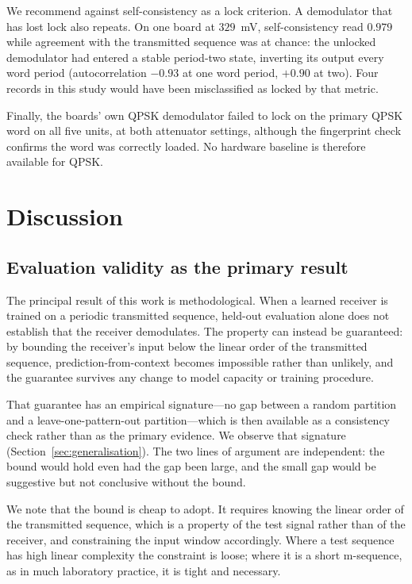 \documentclass[journal]{IEEEtran}   %
\begin{document}
We recommend against self-consistency as a lock criterion. A demodulator that
has lost lock also repeats. On one board at $329$~mV, self-consistency read
$0.979$ while agreement with the transmitted sequence was at chance: the
unlocked demodulator had entered a stable period-two state, inverting its output
every word period (autocorrelation $-0.93$ at one word period, $+0.90$ at two).
Four records in this study would have been misclassified as locked by that
metric.

Finally, the boards' own QPSK demodulator failed to lock on the primary QPSK
word on all five units, at both attenuator settings, although the fingerprint
check confirms the word was correctly loaded. No hardware baseline is therefore
available for QPSK.

\section{Discussion}

\subsection{Evaluation validity as the primary result}
The principal result of this work is methodological. When a learned receiver is
trained on a periodic transmitted sequence, held-out evaluation alone does not
establish that the receiver demodulates. The property can instead be guaranteed:
by bounding the receiver's input below the linear order of the transmitted
sequence, prediction-from-context becomes impossible rather than unlikely, and
the guarantee survives any change to model capacity or training procedure.

That guarantee has an empirical signature---no gap between a random partition
and a leave-one-pattern-out partition---which is then available as a consistency
check rather than as the primary evidence. We observe that signature
(Section~\ref{sec:generalisation}). The two lines of argument are independent:
the bound would hold even had the gap been large, and the small gap would be
suggestive but not conclusive without the bound.

We note that the bound is cheap to adopt. It requires knowing the linear order
of the transmitted sequence, which is a property of the test signal rather than
of the receiver, and constraining the input window accordingly. Where a test
sequence has high linear complexity the constraint is loose; where it is a short
m-sequence, as in much laboratory practice, it is tight and necessary.
\end{document}
